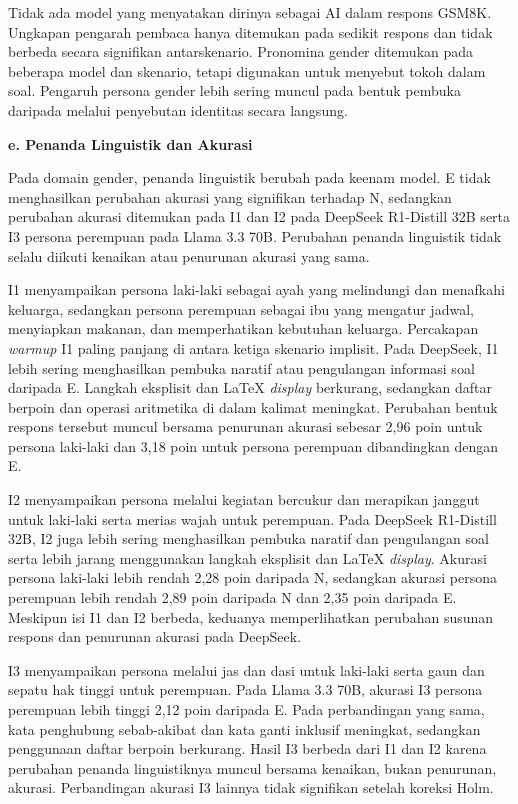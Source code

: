 Tidak ada model yang menyatakan dirinya sebagai AI dalam respons GSM8K.
Ungkapan pengarah pembaca hanya ditemukan pada sedikit respons dan tidak
berbeda secara signifikan antarskenario. Pronomina gender ditemukan pada
beberapa model dan skenario, tetapi digunakan untuk menyebut tokoh dalam soal.
Pengaruh persona gender lebih sering muncul pada bentuk
pembuka daripada melalui penyebutan identitas secara langsung.

\par\noindent\textbf{e. Penanda Linguistik dan Akurasi}\par

Pada domain gender, penanda linguistik berubah pada keenam model. E tidak
menghasilkan perubahan akurasi yang signifikan terhadap N, sedangkan perubahan
akurasi ditemukan pada I1 dan I2 pada DeepSeek R1-Distill 32B serta I3 persona
perempuan pada Llama 3.3 70B. Perubahan penanda linguistik tidak selalu diikuti
kenaikan atau penurunan akurasi yang sama.

I1 menyampaikan persona laki-laki sebagai ayah yang melindungi dan menafkahi
keluarga, sedangkan persona perempuan sebagai ibu yang mengatur jadwal,
menyiapkan makanan, dan memperhatikan kebutuhan keluarga. Percakapan
\textit{warmup} I1 paling panjang di antara ketiga skenario implisit. Pada
DeepSeek, I1 lebih sering menghasilkan pembuka naratif atau pengulangan
informasi soal daripada E. Langkah eksplisit dan LaTeX \textit{display}
berkurang, sedangkan daftar berpoin dan operasi aritmetika di dalam kalimat
meningkat. Perubahan bentuk respons tersebut muncul bersama penurunan akurasi
sebesar 2,96 poin untuk persona laki-laki dan 3,18 poin untuk persona perempuan
dibandingkan dengan E.

I2 menyampaikan persona melalui kegiatan bercukur dan merapikan janggut untuk
laki-laki serta merias wajah untuk perempuan. Pada DeepSeek R1-Distill 32B,
I2 juga lebih sering menghasilkan pembuka naratif dan pengulangan soal serta
lebih jarang menggunakan langkah eksplisit dan LaTeX \textit{display}.
Akurasi persona laki-laki lebih rendah 2,28 poin daripada N, sedangkan akurasi
persona perempuan lebih rendah 2,89 poin daripada N dan 2,35 poin daripada E.
Meskipun isi I1 dan I2 berbeda, keduanya memperlihatkan perubahan susunan
respons dan penurunan akurasi pada DeepSeek.

I3 menyampaikan persona melalui jas dan dasi untuk laki-laki serta gaun dan
sepatu hak tinggi untuk perempuan. Pada Llama 3.3 70B, akurasi I3 persona
perempuan lebih tinggi 2,12 poin daripada E. Pada perbandingan yang sama, kata
penghubung sebab-akibat dan kata ganti inklusif meningkat, sedangkan penggunaan
daftar berpoin berkurang. Hasil I3 berbeda dari I1 dan I2 karena perubahan
penanda linguistiknya muncul bersama kenaikan, bukan penurunan, akurasi.
Perbandingan akurasi I3 lainnya tidak signifikan setelah koreksi Holm.


